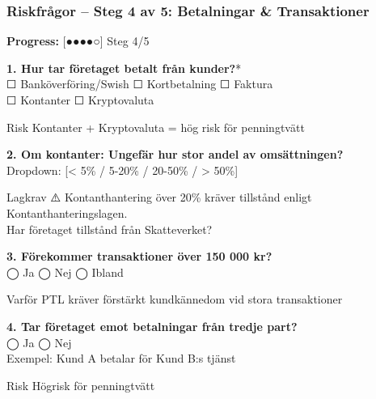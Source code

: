 \documentclass[10pt]{beamer}
\begin{document}
\begin{frame}[label=riskfragor-steg4]
  \frametitle{Riskfrågor – Steg 4 av 5: Betalningar \& Transaktioner}

  \begin{center}
    \textbf{Progress:} [●●●●○] Steg 4/5
  \end{center}

  \vspace{0.3cm}

  \footnotesize

  \textbf{1. Hur tar företaget betalt från kunder?}*\\
  ☐ Banköverföring/Swish \hspace{0.3cm} ☐ Kortbetalning \hspace{0.3cm} ☐ Faktura\\
  ☐ Kontanter \hspace{0.3cm} ☐ Kryptovaluta
  \begin{block}{Risk}
    \tiny Kontanter + Kryptovaluta = hög risk för penningtvätt
  \end{block}

  \vspace{0.3cm}

  \textbf{2. Om kontanter: Ungefär hur stor andel av omsättningen?}\\
  Dropdown: [< 5\% / 5-20\% / 20-50\% / > 50\%]
  \begin{alertblock}{Lagkrav}
    \tiny ⚠️ Kontanthantering över 20\% kräver tillstånd enligt Kontanthanteringslagen.\\
    Har företaget tillstånd från Skatteverket?
  \end{alertblock}

  \vspace{0.3cm}

  \textbf{3. Förekommer transaktioner över 150 000 kr?}\\
  ◯ Ja \hspace{0.3cm} ◯ Nej \hspace{0.3cm} ◯ Ibland
  \begin{block}{Varför}
    \tiny PTL kräver förstärkt kundkännedom vid stora transaktioner
  \end{block}

  \vspace{0.3cm}

  \textbf{4. Tar företaget emot betalningar från tredje part?}\\
  ◯ Ja \hspace{0.5cm} ◯ Nej\\
  \tiny Exempel: Kund A betalar för Kund B:s tjänst
  \begin{block}{Risk}
    \tiny Högrisk för penningtvätt
  \end{block}


\end{frame}
\end{document}
